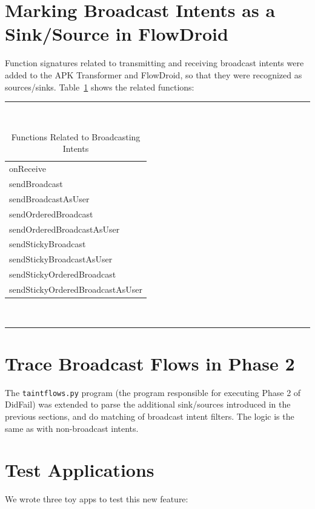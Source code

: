 \section{Marking Broadcast Intents as a Sink/Source in FlowDroid}
Function signatures related to transmitting and receiving broadcast intents were added to the APK Transformer and FlowDroid, so that they were recognized as sources/sinks. Table~\ref{fnc_bcast} shows the related functions:
\begin{table}[!h]
\renewcommand{\arraystretch}{1.3}
\caption{Functions Related to Broadcasting Intents}
\label{fnc_bcast}
\centering
\rule{0.55\textwidth}{0.75pt}
\\
\begin{tabular}{l}
onReceive \\
sendBroadcast \\
sendBroadcastAsUser \\
sendOrderedBroadcast \\
sendOrderedBroadcastAsUser \\
sendStickyBroadcast \\
sendStickyBroadcastAsUser \\
sendStickyOrderedBroadcast \\
sendStickyOrderedBroadcastAsUser \\
\end{tabular}
\\
\rule{0.55\textwidth}{0.75pt}
\end{table}

\section{Trace Broadcast Flows in Phase 2}
The \texttt{taintflows.py} program (the program responsible for executing Phase 2 of DidFail) was extended to parse the additional sink/sources introduced in the previous sections, and do matching of broadcast intent filters. The logic is the same as with non-broadcast intents.

\section{Test Applications}
We wrote three toy apps to test this new feature:

